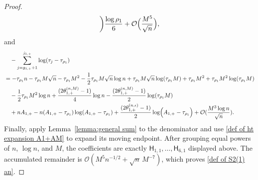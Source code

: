 \documentclass[a4paper]{article}
\numberwithin{equation}{section}
\begin{document}
\begin{proof}
\begin{align*}
\bigg)\frac{\log \rho_1}{6}
+\mathcal{O}\Bigl(\frac{M^5}{\sqrt{n}}\Bigr), 
\end{align*}
and 
\begin{align*}
&\quad -\sum_{j=g_{1,+}+1}^{j_{1,+}}\log(\tau_j-\tau_{\rho_1})
\\
&=
-\tau_{\rho_1}n-\tau_{\rho_1}M\sqrt{n}-\tau_{\rho_1}M^2
-\frac{1}{2}\tau_{\rho_1}M\sqrt{n}\log n+\tau_{\rho_1}M\sqrt{n}\log(\tau_{\rho_1}M)+\tau_{\rho_1}M^2
+\tau_{\rho_1}M^2\log(\tau_{\rho_1}M)
\\
&\quad 
-\frac{1}{2}\tau_{\rho_1}M^2\log n
+\frac{(2\theta_{1,+}^{(n,M)}-1)}{4}\log n
-\frac{(2\theta_{1,+}^{(n,M)}-1)}{2}\log(\tau_{\rho_1}M)
\\
&\quad
+nA_{1,+}
-n(A_{1,+}-\tau_{\rho_1})\log(A_{1,+}-\tau_{\rho_1})
+\frac{(2\theta_{1,+}^{(n,\epsilon)}-1)}{2}\log\Bigl(A_{1,+}-\tau_{\rho_1}\Bigr)
+\mathcal{O}(\frac{M^3\log n}{\sqrt{n}}). 
\end{align*}
Finally, apply Lemma~\ref{lemma:general sum} to the denominator and use \eqref{def of ht expansion A1+AM} to expand its moving endpoint. After grouping equal powers of $n$, $\log n$, and $M$, the coefficients are exactly $\mathsf H_{1,1},\ldots,\mathsf H_{6,1}$ displayed above. The accumulated remainder is $\mathcal O(M^5n^{-1/2}+\sqrt n\,M^{-7})$, which proves \eqref{def of S2(1) an}.

\end{proof}
\end{document}
